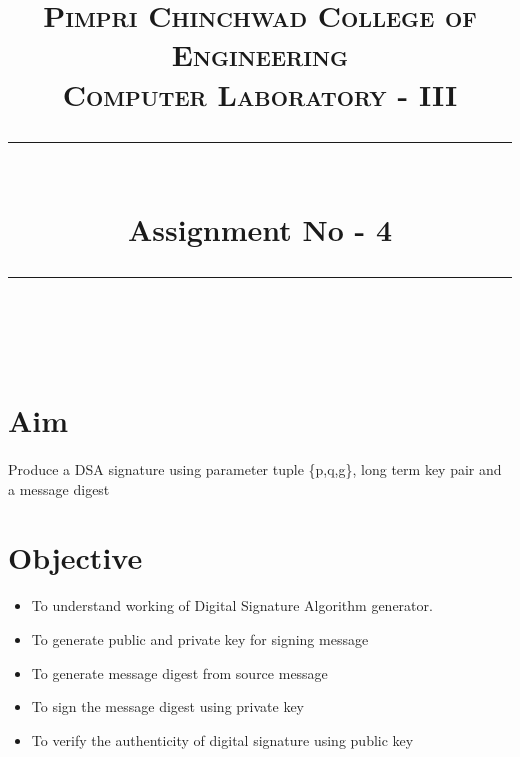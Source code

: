 \documentclass[a4paper,12pt]{article}
\title{
	\normalfont \normalsize 
	\textsc{Pimpri Chinchwad College of Engineering \\ 
		Computer Laboratory - III} \\
	[10pt] 
	\rule{\linewidth}{0.5pt} \\[6pt] 
	\huge Assignment No - 4 \\
	\rule{\linewidth}{2pt}  \\[10pt]
}
\author{}
\date{\normalsize}
\newenvironment{codeblock}{\fontfamily{pcr}\selectfont}{\par}
\begin{document}
\maketitle

\section{Aim}
	\paragraph{} Produce a DSA signature using parameter tuple \{p,q,g\}, long term key pair and a message digest
	
\section{Objective}
	\begin{itemize}
		\item To understand working of Digital Signature Algorithm generator.
		\item To generate public and private key for signing message
        \item To generate message digest from source message
        \item To sign the message digest using private key
        \item To verify the authenticity of digital signature using public key
	\end{itemize}
	
\end{document}
